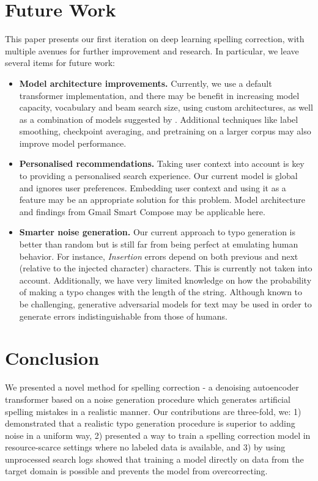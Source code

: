 \documentclass[11pt,a4paper]{article}
\begin{document}
\section{Future Work}
This paper presents our first iteration on deep learning spelling correction, with multiple avenues for further improvement and research. In particular, we leave several items for future work:
\begin{itemize}
\item \textbf{Model architecture improvements.} Currently, we use a default transformer implementation, and there may be benefit in increasing model capacity, vocabulary and beam search size, using custom architectures, as well as a combination of models suggested by . Additional techniques like label smoothing, checkpoint averaging, and pretraining on a larger corpus may also improve model performance.
\item \textbf{Personalised recommendations.} Taking user context into account is key to providing a personalised search experience. Our current model is global and ignores user preferences. Embedding user context and using it as a feature may be an appropriate solution for this problem. Model architecture and findings from Gmail Smart Compose \cite{chen2019gmail} may be applicable here.
\item \textbf{Smarter noise generation.} Our current approach to typo generation is better than random but is still far from being perfect at emulating human behavior. For instance, \textit{Insertion} errors depend on both previous and next (relative to the injected character) characters. This is currently not taken into account. Additionally, we have very limited knowledge on how the probability of making a typo changes with the length of the string. Although known to be challenging, generative adversarial models for text \cite{fedus2018maskgan} may be used in order to generate errors indistinguishable from those of humans.
\end{itemize}

\section{Conclusion}
We presented a novel method for spelling correction - a denoising autoencoder transformer based on a noise generation procedure which generates artificial spelling mistakes in a realistic manner. Our contributions are three-fold, we: 1) demonstrated that a realistic typo generation procedure is superior to adding noise in a uniform way, 2) presented a way to train a spelling correction model in resource-scarce settings where no labeled data is available, and 3) by using unprocessed search logs showed that training a model directly on data from the target domain is possible and prevents the model from overcorrecting.



\end{document}
